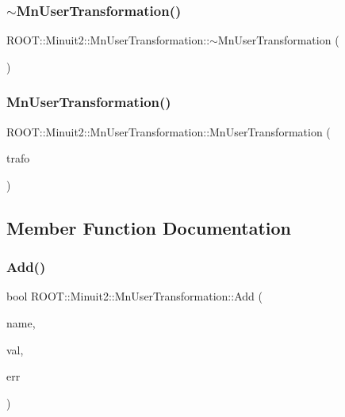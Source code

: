 \subsubsection{\texorpdfstring{$\sim$MnUserTransformation()}{~MnUserTransformation()}\hspace{0.1cm}{\footnotesize\ttfamily [2/2]}}
{\footnotesize\ttfamily R\+O\+O\+T\+::\+Minuit2\+::\+Mn\+User\+Transformation\+::$\sim$\+Mn\+User\+Transformation (\begin{DoxyParamCaption}{ }\end{DoxyParamCaption})\hspace{0.3cm}{\ttfamily [inline]}}

\mbox{\label{classROOT_1_1Minuit2_1_1MnUserTransformation_ae2bba4ce251f0eab8719900620addef9}} 
\subsubsection{\texorpdfstring{MnUserTransformation()}{MnUserTransformation()}\hspace{0.1cm}{\footnotesize\ttfamily [6/6]}}
{\footnotesize\ttfamily R\+O\+O\+T\+::\+Minuit2\+::\+Mn\+User\+Transformation\+::\+Mn\+User\+Transformation (\begin{DoxyParamCaption}\item[{const \mbox{\hyperlink{classROOT_1_1Minuit2_1_1MnUserTransformation}{Mn\+User\+Transformation}} \&}]{trafo }\end{DoxyParamCaption})\hspace{0.3cm}{\ttfamily [inline]}}



\subsection{Member Function Documentation}
\mbox{\label{classROOT_1_1Minuit2_1_1MnUserTransformation_a2ddcd7b0cc5234b386407d7a76db1720}} 
\subsubsection{\texorpdfstring{Add()}{Add()}\hspace{0.1cm}{\footnotesize\ttfamily [1/6]}}
{\footnotesize\ttfamily bool R\+O\+O\+T\+::\+Minuit2\+::\+Mn\+User\+Transformation\+::\+Add (\begin{DoxyParamCaption}\item[{const std\+::string \&}]{name,  }\item[{double}]{val,  }\item[{double}]{err }\end{DoxyParamCaption})}

